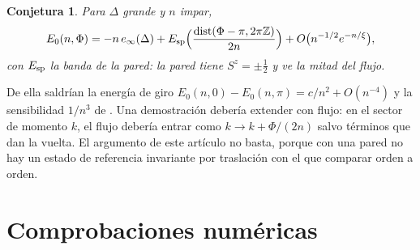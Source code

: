 \documentclass[11pt,a4paper]{article}
\newtheorem{conjetura}[teorema]{Conjetura}
\theoremstyle{remark}
\begin{document}
\begin{conjetura}\label{conj:impar}
Para $\Delta$ grande y $n$ impar,
\[
  E_0(n,\Phi)=-n\,e_\infty(\Delta)+E_{\rm sp}\Big(\frac{\operatorname{dist}(\Phi-\pi,2\pi\mathbb Z)}{2n}\Big)
  +O\big(n^{-1/2}e^{-n/\xi}\big),
\]
con $E_{\rm sp}$ la banda de la pared: la pared tiene $S^z=\pm\tfrac12$ y ve la mitad del flujo.
\end{conjetura}

De ella saldrían la energía de giro $E_0(n,0)-E_0(n,\pi)=c/n^2+O(n^{-4})$ y la sensibilidad $1/n^3$
de \cite{robustez}. Una demostración debería extender \cite[Teorema~2]{dk-kink} con flujo: en el sector
de momento $k$, el flujo debería entrar como $k\to k+\Phi/(2n)$ salvo términos que dan la vuelta. El
argumento de este artículo no basta, porque con una pared no hay un estado de referencia
invariante por traslación con el que comparar orden a orden.

\section{Comprobaciones numéricas}\label{sec:numeros}
\end{document}
